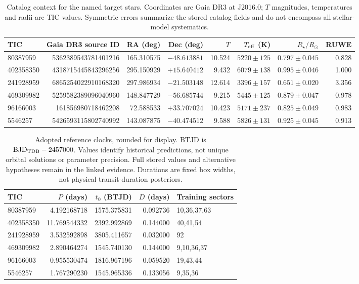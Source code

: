 \documentclass[11pt]{article}
\begin{document}
\begin{table}[htbp]
\centering\scriptsize
\caption{Catalog context for the named target stars. Coordinates are Gaia DR3 at J2016.0; $T$ magnitudes, temperatures and radii are TIC values. Symmetric errors summarize the stored catalog fields and do not encompass all stellar-model systematics.}\label{tab:stars}
\begin{tabular}{@{}l r r r r r r r@{}}
\toprule
TIC & Gaia DR3 source ID & RA (deg) & Dec (deg) & $T$ & $T_{\rm eff}$ (K) & $R_\star/R_\odot$ & RUWE\\
\midrule
80387959 & 5362389543781401216 & 165.310575 & $-48.613881$ & 10.524 & $5220\pm125$ & $0.797\pm0.045$ & 0.828\\
402358350 & 4318715445843296256 & 295.150929 & $+15.640412$ & 9.432 & $6079\pm138$ & $0.995\pm0.046$ & 1.000\\
241928959 & 6865254022910168320 & 297.986934 & $-21.503148$ & 12.614 & $3396\pm157$ & $0.651\pm0.020$ & 3.356\\
469309982 & 5259582389096040960 & 148.847729 & $-56.685744$ & 9.215 & $5445\pm125$ & $0.879\pm0.047$ & 0.978\\
96166003 & 161856980718462208 & 72.588533 & $+33.707024$ & 10.423 & $5171\pm237$ & $0.825\pm0.049$ & 0.983\\
5546257 & 5426593115802740992 & 143.087875 & $-40.474512$ & 9.588 & $5826\pm131$ & $0.925\pm0.045$ & 0.913\\
\bottomrule
\end{tabular}
\end{table}

\begin{table}[htbp]
\centering\small
\caption{Adopted reference clocks, rounded for display. BTJD is ${\rm BJD}_{\rm TDB}-2457000$. Values identify historical predictions, not unique orbital solutions or parameter precision. Full stored values and alternative hypotheses remain in the linked evidence. Durations are fixed box widths, not physical transit-duration posteriors.}\label{tab:clocks}
\begin{tabular}{@{}l r r r l@{}}
\toprule
TIC & $P$ (days) & $t_0$ (BTJD) & $D$ (days) & Training sectors\\
\midrule
80387959 & 4.192168718 & 1575.375831 & 0.092736 & 10,36,37,63\\
402358350 & 11.769544332 & 2392.992869 & 0.144000 & 40,41,54\\
241928959 & 3.532592898 & 3805.411657 & 0.032000 & 92\\
469309982 & 2.890464274 & 1545.740130 & 0.144000 & 9,10,36,37\\
96166003 & 0.955530474 & 1816.967196 & 0.059520 & 19,43,44\\
5546257 & 1.767290230 & 1545.965336 & 0.133056 & 9,35,36\\
\bottomrule
\end{tabular}
\end{table}
\end{document}
